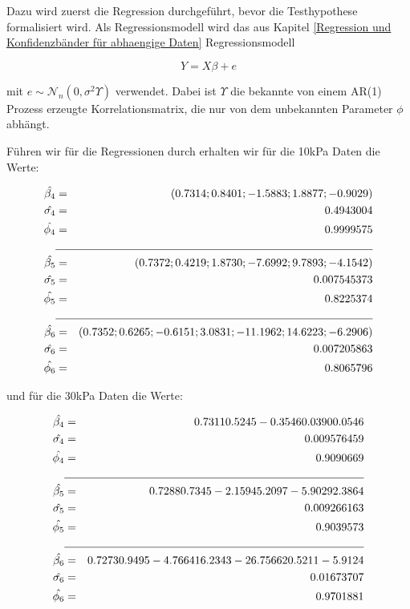 \documentclass[12pt,a4paper]{article}
\theoremstyle{definition}
\theoremstyle{definition}
\theoremstyle{definition}
\theoremstyle{definition}
\begin{document}
Dazu wird zuerst die Regression durchgeführt, bevor die Testhypothese formalisiert wird. Als Regressionsmodell wird das aus Kapitel \ref{Regression und Konfidenzbänder für abhaengige Daten} Regressionsmodell 

\begin{equation*}
Y = X \beta + e
\end{equation*}

mit $e \sim \mathscr{N}_n(0, \sigma^2 \Upsilon)$ verwendet. Dabei ist $\Upsilon$ die bekannte von einem AR(1) Prozess erzeugte Korrelationsmatrix, die nur von dem unbekannten Parameter $\phi$ abhängt.

Führen wir für die Regressionen durch erhalten wir für die 10kPa Daten die Werte:

\begin{eqnarray*}
\hat{\beta_{4}} &=& (0.7314 ; 0.8401 ; -1.5883 ; 1.8877 ; -0.9029) \\
\hat{\sigma_{4}} &=& 0.4943004 \\
\hat{\phi_{4}} &=& 0.9999575 \\
\cline{2-3}
\hat{\beta_{5}} &=& (0.7372 ; 0.4219 ; 1.8730 ; -7.6992 ; 9.7893 ; -4.1542) \\
\hat{\sigma_{5}} &=& 0.007545373 \\
\hat{\phi_{5}} &=& 0.8225374 \\
\cline{2-3}
\hat{\beta_{6}} &=& (0.7352 ; 0.6265 ; -0.6151 ; 3.0831 ; -11.1962 ; 14.6223 ; -6.2906)  \\
\hat{\sigma_{6}} &=& 0.007205863 \\
\hat{\phi_{6}} &=& 0.8065796
\end{eqnarray*}

und für die 30kPa Daten die Werte:

\begin{eqnarray*}
\hat{\beta_{4}} &=&  0.7311  0.5245 -0.3546  0.0390  0.0546  \\
\hat{\sigma_{4}} &=& 0.009576459 \\
\hat{\phi_{4}} &=& 0.9090669 \\
\cline{2-3}
\hat{\beta_{5}} &=&   0.7288   0.7345  -2.1594   5.2097  -5.9029   2.3864 \\
\hat{\sigma_{5}} &=& 0.009266163 \\
\hat{\phi_{5}} &=& 0.9039573 \\
\cline{2-3}
\hat{\beta_{6}} &=&   0.7273   0.9495  -4.7664  16.2343 -26.7566  20.5211  -5.9124  \\
\hat{\sigma_{6}} &=& 0.01673707 \\
\hat{\phi_{6}} &=&  0.9701881
\end{eqnarray*}
\end{document}
